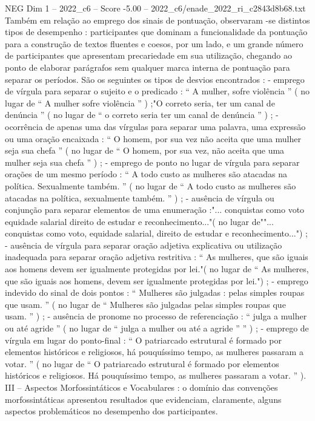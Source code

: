 \begin{textsample}{NEG Dim 1 – 2022\_c6 – Score -5.00 – 2022\_c6/enade\_2022\_ri\_c2843d8b68.txt}
Também em relação ao emprego dos sinais de pontuação, observaram -se distintos tipos de desempenho : participantes que dominam a funcionalidade da pontuação para a construção de textos fluentes e coesos, por um lado, e um grande número de participantes que apresentam precariedade em sua utilização, chegando ao ponto de elaborar parágrafos sem qualquer marca interna de pontuação para separar os períodos.
São os seguintes os tipos de desvios encontrados : - emprego de vírgula para separar o sujeito e o predicado : “ A mulher, sofre violência ” ( no lugar de “ A mulher sofre violência ” ) ;"O correto seria, ter um canal de denúncia ” ( no lugar de “ o correto seria ter um canal de denúncia ” ) ; - ocorrência de apenas uma das vírgulas para separar uma palavra, uma expressão ou uma oração encaixada : “ O homem, por sua vez não aceita que uma mulher seja sua chefa ” ( no lugar de “ O homem, por sua vez, não aceita que uma mulher seja sua chefa ” ) ; - emprego de ponto no lugar de vírgula para separar orações de um mesmo período : “ A todo custo as mulheres são atacadas na política.
Sexualmente também. ” ( no lugar de “ A todo custo as mulheres são atacadas na política, sexualmente também. ” ) ; - ausência de vírgula ou conjunção para separar elementos de uma enumeração :"... conquistas como voto equidade salarial direito de estudar e reconhecimento..."( no lugar de""... conquistas como voto, equidade salarial, direito de estudar e reconhecimento...") ; - ausência de vírgula para separar oração adjetiva explicativa ou utilização inadequada para separar oração adjetiva restritiva : “ As mulheres, que são iguais aos homens devem ser igualmente protegidas por lei."( no lugar de “ As mulheres, que são iguais aos homens, devem ser igualmente protegidas por lei.") ; - emprego indevido do sinal de dois pontos : “ Mulheres são julgadas : pelas simples roupas que usam. ” ( no lugar de “ Mulheres são julgadas pelas simples roupas que usam. ” ) ; - ausência de pronome no processo de referenciação : “ julga a mulher ou até agride ” ( no lugar de “ julga a mulher ou até a agride ” ” ) ; - emprego de vírgula em lugar do ponto-final : “ O patriarcado estrutural é formado por elementos históricos e religiosos, há pouquíssimo tempo, as mulheres passaram a votar. ” ( no lugar de “ O patriarcado estrutural é formado por elementos históricos e religiosos.
Há pouquíssimo tempo, as mulheres passaram a votar. ” ).
III – Aspectos Morfossintáticos e Vocabulares : o domínio das convenções morfossintáticas apresentou resultados que evidenciam, claramente, alguns aspectos problemáticos no desempenho dos participantes.

\end{textsample}
